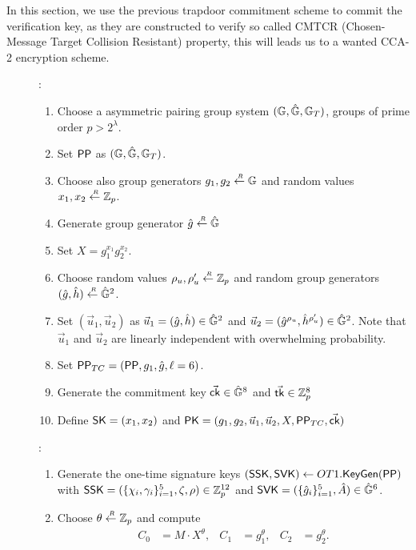 In this section, we use the previous trapdoor commitment scheme to commit the verification key, as they are constructed to verify so called CMTCR (Chosen-Message Target Collision Resistant) property, this will leads us to a wanted CCA-2 encryption scheme.
\begin{description}

\item[]:
  \begin{enumerate}
  \item Choose a asymmetric pairing group system $(\mathbb{G}, \hat{\mathbb{G}}, \mathbb{G}_T)$, groups of prime order $p > 2^\lambda$.
  \item Set $\mathsf{PP}$ as $(\mathbb{G}, \hat{\mathbb{G}}, \mathbb{G}_T)$.
  \item Choose also group generators $g_1, g_2 \stackrel{{\scriptscriptstyle \mkern4mu R}}{\gets} \mathbb{G}$ and random values $x_1, x_2 \stackrel{{\scriptscriptstyle \mkern4mu R}}{\gets} \mathbb{Z}_p$.
  \item Generate group generator $\hat{g} \stackrel{{\scriptscriptstyle \mkern4mu R}}{\gets} \hat{\mathbb{G}}$
  \item Set $X = g_1^{x_1}g_2^{x_2}$.
  \item Choose random values $\rho_u,\rho_u' \stackrel{{\scriptscriptstyle \mkern4mu R}}{\gets} \mathbb{Z}_p$ and random group generators $(\hat{g}, \hat{h}) \stackrel{{\scriptscriptstyle \mkern4mu R}}{\gets} \hat{\mathbb{G}}^2$.
  \item Set $(\vec{u}_1, \vec{u}_2)$ as $\vec{u}_1 = (\hat{g}, \hat{h}) \in \hat{\mathbb{G}}^2$ and $\vec{u}_2 =  (\hat{g}^{\rho_u}, \hat{h}^{\rho_u'}) \in \hat{\mathbb{G}}^2$. Note that $\vec{u}_1$ and $\vec{u}_2$ are linearly independent with overwhelming probability.
  \item Set $\mathsf{PP}_{TC} = (\mathsf{PP}, g_1, \hat{g}, \ell = 6)$.
  \item Generate the commitment key $\vec{\mathsf{ck}} \in \hat{\mathbb{G}}^8$ and $\vec{\mathsf{tk}} \in \mathbb{Z}_p^8$
  \item Define $\mathsf{SK} = (x_1, x_2)$ and $\mathsf{PK} = (g_1, g_2, \vec{u}_1, \vec{u}_2, X, \mathsf{PP}_{TC}, \vec{\mathsf{ck}})$
  \end{enumerate}
\item[]:
  \begin{enumerate}
  \item Generate the one-time signature keys $(\mathsf{SSK}, \mathsf{SVK}) \gets OT1.{\mathsf{KeyGen}}(\mathsf{PP})$ with $\mathsf{SSK} = (\{\chi_i, \gamma_i\}_{i=1}^5, \zeta, \rho) \in \mathbb{Z}_p^{12}$ and $\mathsf{SVK} =  (\{\hat{g}_i\}_{i =1}^5,  \hat{A} ) \in \hat{\mathbb{G}}^6$.
  \item Choose $\theta \stackrel{{\scriptscriptstyle \mkern4mu R}}{\gets} \mathbb{Z}_p$ and compute
    \begin{align*}
      C_0 &= M\cdot X^{\theta}, & C_1 &= g_1^{\theta}, & C_2 &= g_2^{\theta}.

\end{align*}
\end{enumerate}
\end{description}
